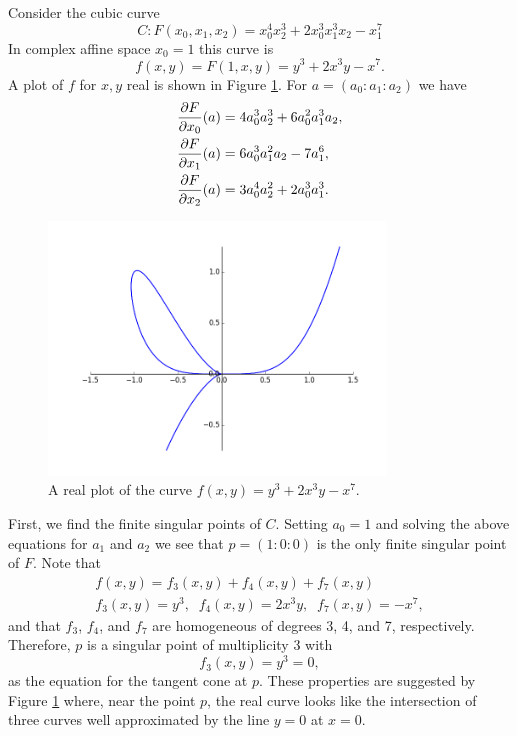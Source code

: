 \begin{example} \label{ex: cubic}
Consider the cubic curve
\[
    C: F(x_0,x_1,x_2) =
    x_0^4 x_2^3 + 2 x_0^3 x_1^3 x_2 - x_1^7
\]
In complex affine space $x_0 = 1$ this curve is
\[
    f(x,y) = F(1,x,y) = y^3 + 2 x^3 y - x^7.
\]
A plot of $f$ for $x,y$ real is shown in Figure \ref{fig: example-cubic}.
For $a = (a_0 : a_1 : a_2)$ we have
\begin{align} \label{eq: singular-conditions}
    \frac{\partial F}{\partial x_0}(a)
    &=
    4 a_{0}^{3} a_{2}^{3} + 6 a_{0}^{2} a_{1}^{3} a_{2}, \notag \\
    \frac{\partial F}{\partial x_1}(a)
    &=
    6 a_{0}^{3} a_{1}^{2} a_{2} - 7 a_{1}^{6}, \notag \\
    \frac{\partial F}{\partial x_2}(a)
    &=
    3 a_{0}^{4} a_{2}^{2} + 2 a_{0}^{3} a_{1}^{3}.
\end{align}

\begin{figure}
  \centering
  \includegraphics[width=0.8\textwidth]{images/2_example_curve.png}
  \caption{A real plot of the curve $f(x,y) = y^3 + 2 x^3 y - x^7$.}
  \label{fig: example-cubic}
\end{figure}

First, we find the finite singular points of $C$. Setting $a_0=1$ and
solving the above equations for $a_1$ and $a_2$ we see that $p = (1 : 0
: 0)$ is the only finite singular point of $F$. Note that
\begin{gather*}
    f(x,y) = f_3(x,y) + f_4(x,y) + f_7(x,y) \\
    f_3(x,y) = y^3, \; \;
    f_4(x,y) = 2 x^3 y, \; \;
    f_7(x,y) = -x^7,
\end{gather*}
and that $f_3$, $f_4$, and $f_7$ are homogeneous of degrees 3, 4, and 7,
respectively. Therefore, $p$ is a singular point of multiplicity 3 with
\[
    f_3(x,y) = y^3 = 0,
\]
as the equation for the tangent cone at $p$. These properties are
suggested by Figure \ref{fig: example-cubic} where, near the point $p$,
the real curve looks like the intersection of three curves well
approximated by the line $y = 0$ at $x = 0$.


\end{example}
